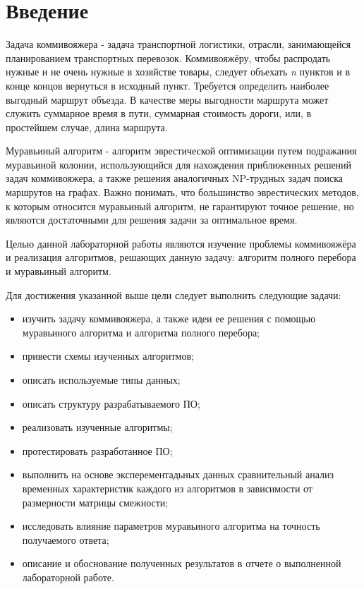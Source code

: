 \chapter*{Введение}

Задача коммивояжера - задача транспортной логистики, отрасли, занимающейся планированием транспортных перевозок. Коммивояжёру, чтобы распродать нужные и не очень нужные в хозяйстве товары, следует объехать \textit{n} пунктов и в конце концов вернуться в исходный пункт. Требуется определить наиболее выгодный маршрут объезда. В качестве меры выгодности маршрута может служить суммарное время в пути, суммарная стоимость дороги, или, в простейшем случае, длина маршрута.

Муравьиный алгоритм \cite{yualianov} - алгоритм эврестической оптимизации путем подражания муравьиной колонии, использующийся для нахождения приближенных решений задач коммивояжера, а также решения аналогичных NP-трудных задач поиска маршрутов на графах. Важно понимать, что большинство эврестических методов, к которым относится муравьиный алгоритм, не гарантируют точное решение, но являются достаточными для решения задачи за оптимальное время.

Целью данной лабораторной работы являются изучение проблемы коммивояжёра и реализация алгоритмов, решающих данную задачу: алгоритм полного перебора и муравьиный алгоритм.

Для достижения указанной выше цели следует выполнить следующие задачи:
\begin{itemize}
	\item изучить задачу коммивояжера, а также идеи ее решения с помощью муравьиного алгоритма и алгоритма полного перебора;
	\item привести схемы изученных алгоритмов;
	\item описать используемые типы данных;
	\item описать структуру разрабатываемого ПО;
	\item реализовать изученные алгоритмы;
	\item протестировать разработанное ПО;
	\item выполнить на основе эксперементадьных данных сравнительный анализ временных характеристик каждого из алгоритмов в зависимости от размерности матрицы смежности;
	\item исследовать влияние параметров муравьиного алгоритма на точность получаемого ответа;
	\item описание и обоснование полученных результатов в отчете о выполненной лабораторной работе. 
\end{itemize}

